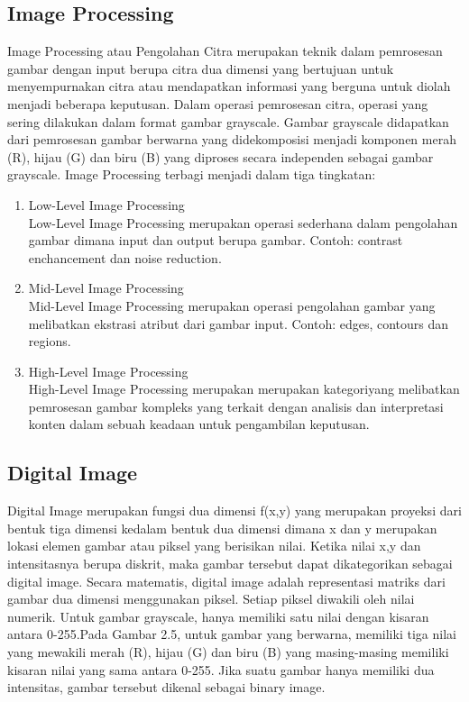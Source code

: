 \subsection{Image Processing}
Image Processing atau Pengolahan Citra merupakan teknik dalam pemrosesan gambar dengan input berupa 
citra dua dimensi yang bertujuan untuk menyempurnakan citra atau mendapatkan informasi yang berguna 
untuk diolah menjadi beberapa keputusan. Dalam operasi pemrosesan citra, operasi yang sering dilakukan 
dalam format gambar grayscale. Gambar grayscale didapatkan dari pemrosesan gambar berwarna yang 
didekomposisi menjadi komponen merah (R), hijau (G) dan biru (B) yang diproses secara independen sebagai 
gambar grayscale. Image Processing terbagi menjadi dalam tiga tingkatan\citep{ImageProcesing}:
    \begin{enumerate}
        \item Low-Level Image Processing \\
        Low-Level Image Processing merupakan operasi sederhana dalam pengolahan gambar dimana input dan 
        output berupa gambar. Contoh: contrast enchancement dan noise reduction.
        \item Mid-Level Image Processing \\
        Mid-Level Image Processing merupakan operasi pengolahan gambar yang melibatkan ekstrasi atribut dari 
        gambar input. Contoh: edges, contours dan regions.
        \item High-Level Image Processing \\
        High-Level Image Processing merupakan merupakan kategoriyang melibatkan pemrosesan gambar kompleks 
        yang terkait dengan analisis dan interpretasi konten dalam sebuah keadaan untuk pengambilan keputusan.
    \end{enumerate}

\subsection{Digital Image}
Digital Image merupakan fungsi dua dimensi f(x,y) yang merupakan proyeksi dari bentuk tiga dimensi kedalam 
bentuk dua dimensi dimana x dan y merupakan lokasi elemen gambar atau piksel yang berisikan nilai. Ketika
nilai x,y dan intensitasnya berupa diskrit, maka gambar tersebut dapat dikategorikan sebagai digital
image. Secara matematis, digital image adalah representasi matriks dari gambar dua dimensi menggunakan
piksel. Setiap piksel  diwakili  oleh  nilai  numerik. Untuk  gambar  grayscale,  hanya  memiliki  
satu  nilai dengan kisaran antara 0-255.Pada Gambar 2.5, untuk gambar yang berwarna, memiliki tiga 
nilai yang mewakili merah (R), hijau (G) dan biru (B) yang masing-masing memiliki kisaran nilai yang 
sama antara 0-255. Jika suatu gambar hanya memiliki dua intensitas, gambar tersebut dikenal sebagai 
binary image\citep{ImageProcesing}.
